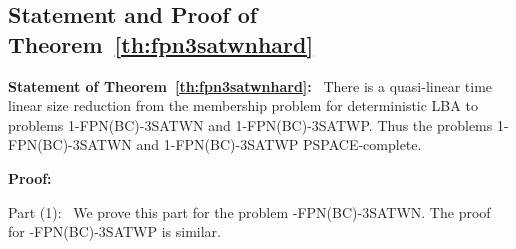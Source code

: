 \iffalse
\subsection{Statement and Proof of Corollary~\ref{th:pn3sat}}

\noindent
\textbf{Statement of Corollary~\ref{th:pn3sat}:}~
The problem 1-PN-3SAT is in NSPACE$(n)$.
There is a quasi-linear
time linear size reduction from the membership problem for non-deterministic
LBA to 1-FPN(BC)-3SAT.
Thus the  problem 1-PN-3SAT is PSPACE-complete. 

\medskip

\noindent
{\bf Proof:}  
Orlin \cite{Or82a} and Papadimitriou \cite{Pa94} have shown that
the problem {\sf 1-PN-3SAT} is in {\sf NSPACE(n)}. 
We only prove that the problem is {\sf PSPACE}-hard by a linear size
reduction from the membership problem for a non-deterministic {\sf LBA}.
(In contrast, The reduction in \cite{Or82a} is a square size reduction.)  
Observe that if an instance of {\sf 1-PN-3SAT} has a solution
then the assignment to the variables is periodic. If there are $n$ variables
in the static formula we can have no more than $2^{2n}$ distinct assignments to
the variables to consider. 
Hence starting from  an instance of {\sf 1-FPN-3SAT} 
$(F(U,C(i, i+1)),m)$ where $n = |U|$   and $m = 2^{2n}$ we  see that 
$F^m$ is satisfiable if and only if $F^{\infty}$ is satisfiable.
This completes the proof that the problem {\sf 1-PN-3SAT} is 
{\sf PSPACE}-complete. \hfill\QED
\fi

\subsection{Statement and Proof of Theorem~\ref{th:fpn3satwnhard}}

\noindent
\textbf{Statement of Theorem~\ref{th:fpn3satwnhard}:}~
There is a quasi-linear
time linear size reduction from the membership problem for deterministic
LBA to problems 1-FPN(BC)-3SATWN and  1-FPN(BC)-3SATWP.
Thus the problems 1-FPN(BC)-3SATWN and  1-FPN(BC)-3SATWP PSPACE-complete.

\medskip

\noindent
{\bf Proof:} 

\smallskip

\noindent
Part (1):~
We prove  this part for the problem {-FPN(BC)-3SATWN}. 
The proof for {-FPN(BC)-3SATWP} is similar.

